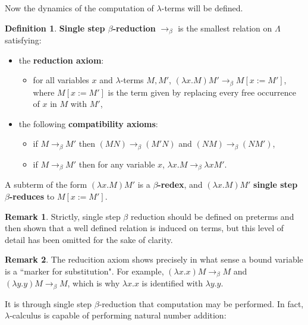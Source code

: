 \documentclass[12pt]{article}
\theoremstyle{plane}
\theoremstyle{definition}
\newtheorem{defn}{Definition}
\newtheorem{remark}{Remark}
\begin{document}
	Now the dynamics of the computation of $\lambda$-terms will be defined.
	\begin{defn}
		\textbf{Single step $\beta$-reduction} $\to_\beta$ is the smallest relation on $\Lambda$ satisfying:
		\begin{itemize}
			\item the \textbf{reduction axiom}:
			\begin{itemize}
				\item for all variables $x$ and $\lambda$-terms $M,M'$, $(\lambda x. M)M' \to_\beta M[x := M']$, where $M[x:= M']$ is the term given by replacing every free occurrence of $x$ in $M$ with $M'$,
			\end{itemize}
			\item the following \textbf{compatibility axioms}:
			\begin{itemize}
				\item if $M \to_\beta M'$ then $(MN) \to_\beta (M'N)$ and $(NM) \to_\beta (NM')$,
				\item if $M \to_\beta M'$ then for any variable $x$, $\lambda x. M \to_\beta \lambda x M'$.
			\end{itemize}
		\end{itemize}
		A subterm of the form $(\lambda x. M)M'$ is a \textbf{$\beta$-redex}, and $(\lambda x. M)M'$ \textbf{single step $\beta$-reduces} to $M[x := M']$.
	\end{defn}
	\begin{remark}
		Strictly, single step $\beta$ reduction should be defined on preterms and then shown that a well defined relation is induced on terms, but this level of detail has been omitted for the sake of clarity.
	\end{remark}
	\begin{remark}
		\label{markersforsubstitution}
		The reducition axiom shows precisely in what sense a bound variable is a ``marker for substitution". For example, $(\lambda x.x)M \to_\beta M$ and $(\lambda y.y)M \to_\beta M$, which is why $\lambda x.x$ is identified with $\lambda y.y$.
	\end{remark}
	It is through single step $\beta$-reduction that computation may be performed. In fact, $\lambda$-calculus is capable of performing natural number addition:
\end{document}

